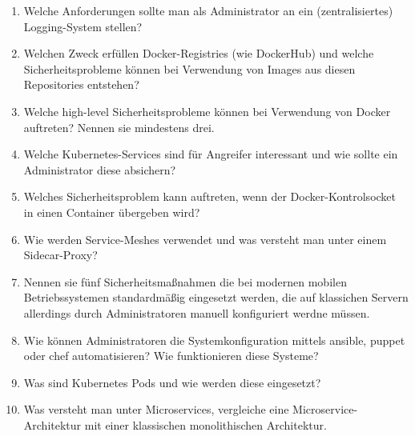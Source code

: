 \documentclass[11pt,fleqn,openany]{book} %
\begin{document}
\begin{enumerate}
	\item Welche Anforderungen sollte man als Administrator an ein (zentralisiertes) Logging-System stellen?
	\item Welchen Zweck erfüllen Docker-Registries (wie DockerHub) und welche Sicherheitsprobleme können bei Verwendung von Images aus diesen Repositories entstehen?
	\item Welche high-level Sicherheitsprobleme können bei Verwendung von Docker auftreten? Nennen sie mindestens drei.
	\item Welche Kubernetes-Services sind für Angreifer interessant und wie sollte ein Administrator diese absichern?
	\item Welches Sicherheitsproblem kann auftreten, wenn der Docker-Kontrolsocket in einen Container übergeben wird?
	\item Wie werden Service-Meshes verwendet und was versteht man unter einem Sidecar-Proxy?
	\item Nennen sie fünf Sicherheitsmaßnahmen die bei modernen mobilen Betriebssystemen standardmäßig eingesetzt werden, die auf klassichen Servern allerdings durch Administratoren manuell konfiguriert werdne müssen.
	\item Wie können Administratoren die Systemkonfiguration mittels ansible, puppet oder chef automatisieren? Wie funktionieren diese Systeme?
	\item Was sind Kubernetes Pods und wie werden diese eingesetzt?
	\item Was versteht man unter Microservices, vergleiche eine Microservice-Architektur mit einer klassischen monolithischen Architektur.
\end{enumerate}
\end{document}

